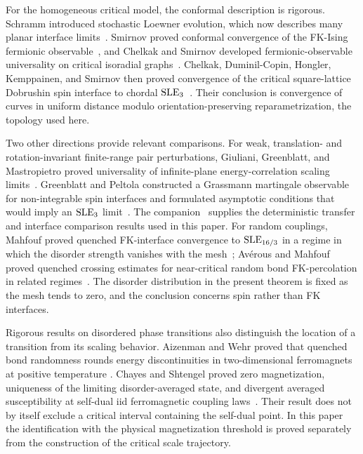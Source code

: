 For the homogeneous critical model, the conformal description is
rigorous. Schramm introduced stochastic Loewner evolution, which now describes
many planar interface limits~\cite{Schramm}. Smirnov proved conformal
convergence of the FK-Ising fermionic observable~\cite{Smirnov}, and
Chelkak and Smirnov developed fermionic-observable universality on
critical isoradial graphs~\cite{ChelkakSmirnov}. Chelkak,
Duminil-Copin, Hongler, Kemppainen, and Smirnov then proved convergence
of the critical square-lattice Dobrushin spin interface to chordal
$\operatorname{SLE}_3$~\cite[Theorem~1 and Equation~(1)]{CDHKS}. Their conclusion is
convergence of curves in uniform distance modulo orientation-preserving
reparametrization, the topology used here.

Two other directions provide relevant comparisons. For weak, translation- and rotation-invariant
finite-range pair perturbations, Giuliani, Greenblatt, and
Mastropietro proved universality of infinite-plane energy-correlation
scaling limits~\cite[Theorems~1.1--1.2]{GGM}. Greenblatt and Peltola
constructed a Grassmann martingale observable for non-integrable spin
interfaces and formulated asymptotic conditions that would imply an
$\operatorname{SLE}_3$ limit~\cite{GP}. The companion~\cite{S} supplies the
deterministic transfer and interface comparison results used in this
paper. For random couplings, Mahfouf proved quenched FK-interface
convergence to $\operatorname{SLE}_{16/3}$ in a regime in which the disorder strength
vanishes with the mesh~\cite[Theorem~1.6]{Mahfouf}; Av\'erous and
Mahfouf proved quenched crossing estimates for near-critical random
bond FK-percolation in related regimes~\cite[Theorem~1.6]{AM}.
The disorder distribution in the present theorem is fixed as the mesh
tends to zero, and the conclusion concerns spin rather than FK interfaces.

Rigorous results on disordered phase transitions also distinguish the
location of a transition from its scaling behavior. Aizenman and Wehr
proved that quenched bond randomness rounds energy discontinuities in
two-dimensional ferromagnets at positive temperature
\cite[Theorem~4.1]{AW}. Chayes and Shtengel proved zero magnetization,
uniqueness of the limiting disorder-averaged state, and divergent
averaged susceptibility at self-dual iid
ferromagnetic coupling laws~\cite[Theorems~$1'$--$2'$]{ChayesShtengel}.
Their result does not by itself exclude a critical interval containing
the self-dual point. In this paper the identification with the physical
magnetization threshold is proved separately from the construction of
the critical scale trajectory.

